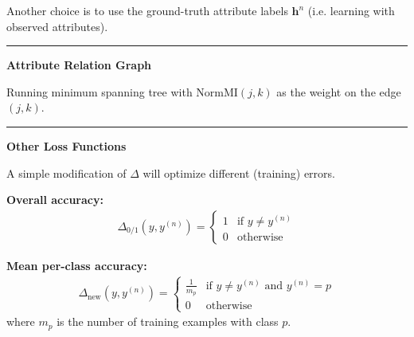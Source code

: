 \documentclass[a0]{a0poster}
\newcommand{\mybf}[1]{\mathbf{#1}}
\renewcommand{\paragraph}[1]{{\color{DarkRed2}\vspace{1cm}\par{\LARGE\bf #1}\par}}
\newcommand{\awfhline}{\rule{\textwidth}{1pt}}
\newlength{\colwidth}
\newcommand{\col}[1]{
\fbox{
\begin{minipage}[t]{\colwidth}\raggedright\large
#1
\end{minipage}
}
}
\begin{document}
\begin{center}
{{%

Another choice is to use the ground-truth attribute labels $\mybf{h}^n$ (i.e. learning with observed attributes).
} %

\awfhline
\paragraph{Attribute Relation Graph}
{\LARGE Running minimum spanning tree with $\mathrm{NormMI}(j,k)$ as the weight on the edge $(j,k)$.}


\awfhline
\paragraph{Other Loss Functions}
{\LARGE A simple modification of $\Delta$ will optimize different (training) errors.

{\bf Overall accuracy:}
\begin{eqnarray*}
\Delta_{\mathrm{0/1}}(y,y^{(n)})=\left\{ \begin{array}{ll}
    1 & \textrm{if $y\neq y^{(n)}$}\\
    0 & \textrm{otherwise}
    \end{array} \right.
\end{eqnarray*}

{\bf Mean per-class accuracy:}
\begin{eqnarray*}
\Delta_{\mathrm{new}}(y,y^{(n)})=\left\{ \begin{array}{ll}
    \frac{1}{m_p} & \textrm{if $y\neq y^{(n)}$ and $y^{(n)}=p$}\\
    0 & \textrm{otherwise}
    \end{array} \right.
\end{eqnarray*}
where $m_p$ is the number of training examples with class $p$.
}
} %
%
\col{
\paragraph{Experiments}

}
\end{center}
\end{document}
